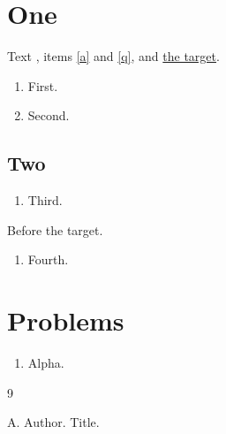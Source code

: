 \documentclass{article}
\begin{document}
\tableofcontents
\section{One}
Text \cite{x}, items \ref{a} and \ref{q}, and \hyperlink{t}{the target}.
\begin{enumerate}
  \item {}\label{a} First.
  \item Second.
\end{enumerate}
\subsection{Two}
\begin{enumerate}
  \label{q}
  \item Third.
\end{enumerate}
Before the target.
\begin{enumerate}\hypertarget{t}{}\item Fourth.\end{enumerate}
\section*{Problems}
{}
\begin{enumerate}
  \item Alpha.
\end{enumerate}
\begin{thebibliography}{9}
   A. Author. Title.
\end{thebibliography}
\end{document}
